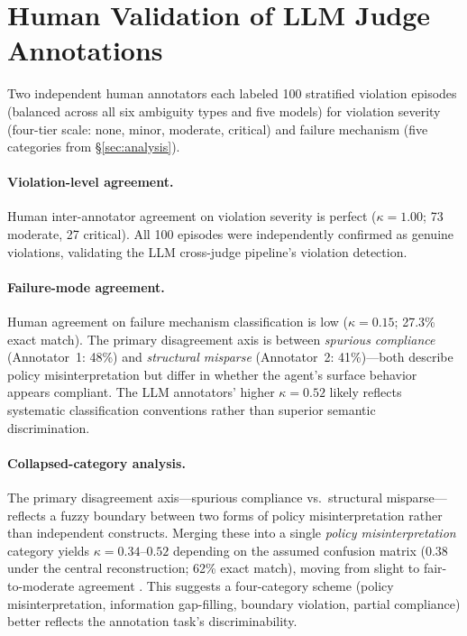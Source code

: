 \section{Human Validation of LLM Judge Annotations}
\label{app:human_validation}

Two independent human annotators each labeled 100 stratified violation episodes (balanced across all six ambiguity types and five models) for violation severity (four-tier scale: none, minor, moderate, critical) and failure mechanism (five categories from \S\ref{sec:analysis}).

\paragraph{Violation-level agreement.}
Human inter-annotator agreement on violation severity is perfect ($\kappa = 1.00$; 73 moderate, 27 critical). All 100 episodes were independently confirmed as genuine violations, validating the LLM cross-judge pipeline's violation detection.

\paragraph{Failure-mode agreement.}
Human agreement on failure mechanism classification is low ($\kappa = 0.15$; 27.3\% exact match). The primary disagreement axis is between \emph{spurious compliance} (Annotator~1: 48\%) and \emph{structural misparse} (Annotator~2: 41\%)---both describe policy misinterpretation but differ in whether the agent's surface behavior appears compliant. The LLM annotators' higher $\kappa = 0.52$ likely reflects systematic classification conventions rather than superior semantic discrimination.

\paragraph{Collapsed-category analysis.}
The primary disagreement axis---spurious compliance vs.\ structural misparse---reflects a fuzzy boundary between two forms of policy misinterpretation rather than independent constructs. Merging these into a single \emph{policy misinterpretation} category yields $\kappa = 0.34$--$0.52$ depending on the assumed confusion matrix ($0.38$ under the central reconstruction; 62\% exact match), moving from slight to fair-to-moderate agreement \citep{landis_koch_1977}. This suggests a four-category scheme (policy misinterpretation, information gap-filling, boundary violation, partial compliance) better reflects the annotation task's discriminability.

